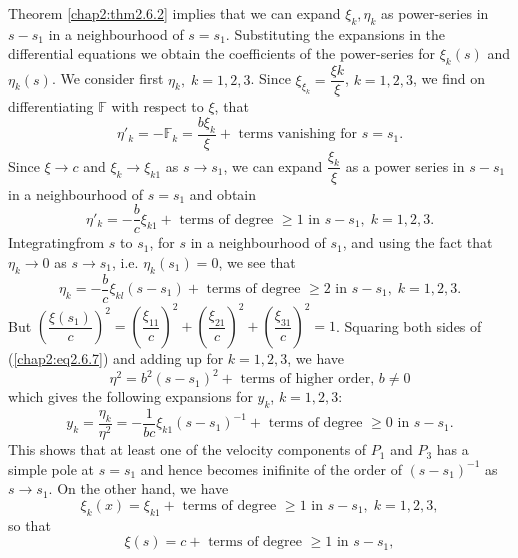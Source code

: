 Theorem \ref{chap2:thm2.6.2} implies that we can expand $\xi_k, \eta_k$ as power-series in $s - s_1$ in a neighbourhood of $s = s_1$. Substituting the expansions in the differential equations we obtain the coefficients of the power-series for $\xi_k(s)$ and $\eta_k(s)$. We consider first $\eta_k, \; k =1,2,3$. Since $\xi_{\xi_k} = \dfrac{\xi k}{\xi}$, $k = 1,2,3$, we find on differentiating $\mathbb{F}$ with respect to $\xi$, that 
$$
\eta'_k = - \mathbb{F}_k = \frac{b \xi_k}{\xi} + \text{ terms vanishing for } s= s_1. 
$$
Since $\xi \to c$ and $\xi_k \to \xi_{k1} $ as $s \to s_1$, we can expand $\dfrac{\xi_k}{\xi}$ as a power series in $s -s_1$ in a neighbourhood of $s =s_1$ and obtain 
$$
\eta'_k = -\frac{b}{c} \xi_{k1} + \text{ terms of degree } \geq 1 \text{ in } s-s_1, \; k =1,2,3.
$$
Integrating\pageoriginale from $s$ to $s_1$, for $s$ in a neighbourhood of $s_1$, and using the fact that $\eta_k \to 0$ as $s \to s_1$, i.e. $\eta_k (s_1) = 0$, we see that 
\begin{equation*}
\eta_k = - \frac{b}{c} \xi_{kl} (s-s_1)+\text{ terms of degree } \geq 2 \text{ in } s - s_1, \; k = 1,2,3.\tag{2.6.7}\label{chap2:eq2.6.7} 
\end{equation*}
But $\left(\dfrac{\xi(s_1)}{c} \right)^2 = \left(\dfrac{\xi_{11}}{c}\right)^2 + \left( \dfrac{\xi_{21}}{c}\right)^2 + \left(\dfrac{\xi_{31}}{c} \right)^2  =1$. Squaring both sides of (\ref{chap2:eq2.6.7}) and adding up for $k = 1,2,3$, we have
\begin{equation*}
\eta^2 = b^2 (s-s_1)^2 + \text{ terms of higher order, } b\neq 0\tag{2.6.8}\label{chap2:eq2.6.8} 
\end{equation*}
which gives the following expansions for $y_k$, $k=1,2,3$:
\begin{equation*}
y_k =\frac{\eta_k}{\eta^2} = - \frac{1}{bc} \xi_{k1}  (s-s_1)^{-1} + \text{ terms of degree } \geq 0 \text{ in } s - s_1. \tag{2.6.9}\label{chap2:eq2.6.9} 
\end{equation*}
This shows that at least one of the velocity components of $P_1$ and $P_3$ has a simple pole at $s = s_1$ and hence becomes inifinite of the order of $(s-s_1)^{-1}$ as $s \to s_1$. On the other hand, we have 
\begin{equation*}
\xi_k (x) = \xi_{k1} + \text{ terms of degree } \geq 1 \text{ in } s - s_1, \; k = 1,2,3, \tag{2.6.10}\label{chap2:eq2.6.10} 
\end{equation*}
so that 
\begin{equation*}
\xi(s) = c + \text{ terms of degree } \geq 1 \text{ in } s - s_1, 
\tag{2.6.11}\label{chap2:eq2.6.11} 
\end{equation*}
